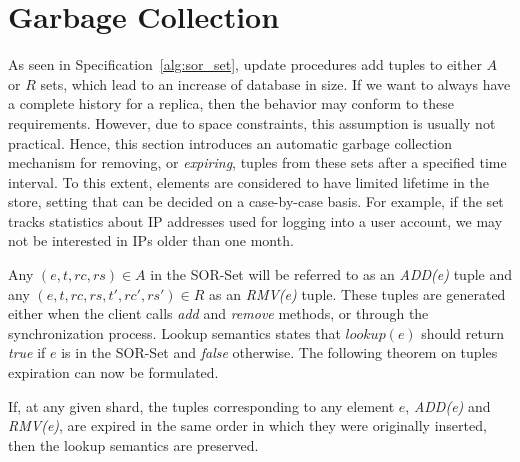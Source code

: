\section{Garbage Collection}
\label{sec:garbage_collection}

As seen in Specification~\ref{alg:sor_set}, update procedures add tuples to
either $A$ or $R$ sets, which lead to an increase of database in size. If we
want to always have a complete history for a replica, then the behavior may
conform to these requirements. However, due to space constraints, this
assumption is usually not practical. Hence, this section introduces an automatic
garbage collection mechanism for removing, or \textit{expiring}, tuples from
these sets after a specified time interval. To this extent, elements are
considered to have limited lifetime in the store, setting that can be decided on
a case-by-case basis. For example, if the set tracks statistics about IP
addresses used for logging into a user account, we may not be interested in IPs
older than one month.

Any $(e, t, rc, rs) \in A$ in the SOR-Set will be referred to as an
\textit{ADD(e)} tuple and any $(e, t, rc, rs, t', rc', rs') \in R$ as an
\textit{RMV(e)} tuple. These tuples are generated either when the client calls
\textit{add} and \textit{remove} methods, or through the synchronization
process. Lookup semantics states that $\textit{lookup}(e)$ should return
\textit{true} if $e$ is in the SOR-Set and \textit{false} otherwise. The
following theorem on tuples expiration can now be formulated.

\begin{theorem*}
\begin{itshape}
If, at any given shard, the tuples corresponding to any element $e$,
\textit{ADD(e)} and \textit{RMV(e)}, are expired in the same order in which they
were originally inserted, then the lookup semantics are preserved.
\end{itshape}
\end{theorem*}

